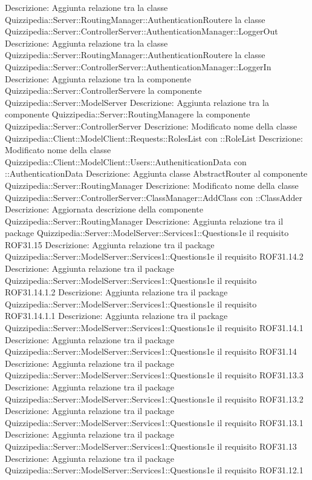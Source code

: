 Descrizione: Aggiunta relazione tra la classe Quizzipedia::Server::RoutingManager::AuthenticationRoutere la classe Quizzipedia::Server::ControllerServer::AuthenticationManager::LoggerOut 
Descrizione: Aggiunta relazione tra la classe Quizzipedia::Server::RoutingManager::AuthenticationRoutere la classe Quizzipedia::Server::ControllerServer::AuthenticationManager::LoggerIn 
Descrizione: Aggiunta relazione tra la componente Quizzipedia::Server::ControllerServere la componente Quizzipedia::Server::ModelServer 
Descrizione: Aggiunta relazione tra la componente Quizzipedia::Server::RoutingManagere la componente Quizzipedia::Server::ControllerServer 
Descrizione: Modificato nome della classe Quizzipedia::Client::ModelClient::Requests::RolesList con ::RoleList 
Descrizione: Modificato nome della classe Quizzipedia::Client::ModelClient::Users::AutheniticationData con ::AuthenticationData 
Descrizione: Aggiunta classe AbstractRouter al componente Quizzipedia::Server::RoutingManager 
Descrizione: Modificato nome della classe Quizzipedia::Server::ControllerServer::ClassManager::AddClass con ::ClassAdder 
Descrizione: Aggiornata descrizione della componente Quizzipedia::Server::RoutingManager 
Descrizione: Aggiunta relazione tra il package Quizzipedia::Server::ModelServer::Services1::Questions1e il requisito ROF31.15 
Descrizione: Aggiunta relazione tra il package Quizzipedia::Server::ModelServer::Services1::Questions1e il requisito ROF31.14.2 
Descrizione: Aggiunta relazione tra il package Quizzipedia::Server::ModelServer::Services1::Questions1e il requisito ROF31.14.1.2 
Descrizione: Aggiunta relazione tra il package Quizzipedia::Server::ModelServer::Services1::Questions1e il requisito ROF31.14.1.1 
Descrizione: Aggiunta relazione tra il package Quizzipedia::Server::ModelServer::Services1::Questions1e il requisito ROF31.14.1 
Descrizione: Aggiunta relazione tra il package Quizzipedia::Server::ModelServer::Services1::Questions1e il requisito ROF31.14 
Descrizione: Aggiunta relazione tra il package Quizzipedia::Server::ModelServer::Services1::Questions1e il requisito ROF31.13.3 
Descrizione: Aggiunta relazione tra il package Quizzipedia::Server::ModelServer::Services1::Questions1e il requisito ROF31.13.2 
Descrizione: Aggiunta relazione tra il package Quizzipedia::Server::ModelServer::Services1::Questions1e il requisito ROF31.13.1 
Descrizione: Aggiunta relazione tra il package Quizzipedia::Server::ModelServer::Services1::Questions1e il requisito ROF31.13 
Descrizione: Aggiunta relazione tra il package Quizzipedia::Server::ModelServer::Services1::Questions1e il requisito ROF31.12.1 
